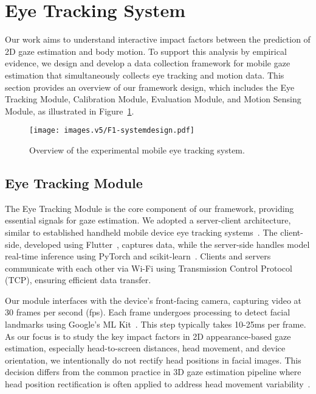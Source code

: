 \section{Eye Tracking System}
\label{sec:systemdesign}

Our work aims to understand interactive impact factors between the prediction of 2D gaze estimation and body motion. To support this analysis by empirical evidence, we design and develop a data collection framework for mobile gaze estimation that simultaneously collects eye tracking and motion data. This section provides an overview of our framework design, which includes the Eye Tracking Module, Calibration Module, Evaluation Module, and Motion Sensing Module, as illustrated in Figure~\ref{fig:system-comp}.

\begin{figure}[!htbp]
    \centering
    \texttt{[image: images.v5/F1-systemdesign.pdf]}
    \caption{Overview of the experimental mobile eye tracking system.}
    \label{fig:system-comp}
\end{figure}


\subsection{Eye Tracking Module}\label{subsec:eye_tracking_module}

The Eye Tracking Module is the core component of our framework, providing essential signals for gaze estimation. We adopted a server-client architecture, similar to established handheld mobile device eye tracking systems~\cite{lei2023DynamicRead, kong2021eyemu}. The client-side, developed using Flutter~\cite{flutter2024}, captures data, while the server-side handles model real-time inference using PyTorch and scikit-learn~\cite{pytorch2024, sklearn2024}. Clients and servers communicate with each other via Wi-Fi using Transmission Control Protocol (TCP), ensuring efficient data transfer.

Our module interfaces with the device's front-facing camera, capturing video at 30 frames per second (fps). Each frame undergoes processing to detect facial landmarks using Google's ML Kit~\cite{Google2023mlkit}. This step typically takes 10-25ms per frame. As our focus is to study the key impact factors in 2D appearance-based gaze estimation, especially head-to-screen distances, head movement, and device orientation, we intentionally do not rectify head positions in facial images. This decision differs from the common practice in 3D gaze estimation pipeline where head position rectification is often applied to address head movement variability~\cite{zhang18revisiting}. 

